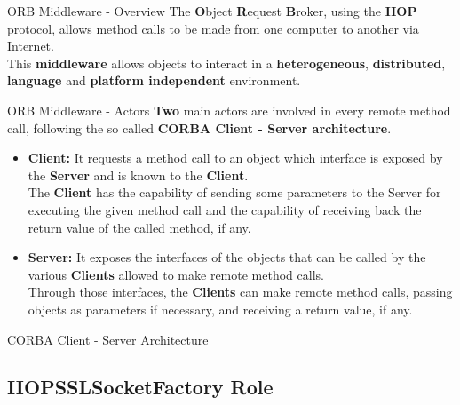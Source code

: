 \documentclass{../common/latex_classes/pdf_presentation}
\begin{document}
		\begin{frame}{ORB Middleware - Overview}
			The \textbf{O}bject \textbf{R}equest \textbf{B}roker, using the \textbf{IIOP} protocol, allows method calls to be made from one computer to another via Internet. \\
			This \textbf{middleware} allows objects to interact in a \textbf{heterogeneous}, \textbf{distributed}, \textbf{language} and \textbf{platform independent} environment.	
		\end{frame}
			
		\begin{frame}{ORB Middleware - Actors}
			\textbf{Two} main actors are involved in every remote method call, following the so called \textbf{CORBA Client - Server architecture}.
			\begin{itemize}
				\item \textbf{Client:}
					It requests a method call to an object which interface is exposed by the \textbf{Server} and is known to the \textbf{Client}.\\
					The \textbf{Client} has the capability of sending some parameters to the Server for executing the given method call and the capability of receiving back the return value of the called method, if any.
				\item \textbf{Server:}
					It exposes the interfaces of the objects that can be called by the various \textbf{Clients} allowed to make remote method calls.\\
					Through those interfaces, the \textbf{Clients} can make remote method calls, passing objects as parameters if necessary, and receiving a return value, if any.
			\end{itemize}
		\end{frame}
		
		\begin{frame}{CORBA Client - Server Architecture}
		\end{frame}
		
		\subsection{IIOPSSLSocketFactory Role}
		
\end{document}
